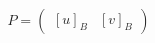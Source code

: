 \documentclass[preview]{standalone}
\begin{document}
\begin{align*}
P = \begin{pmatrix} [u]_B & [v]_B \end{pmatrix}
\end{align*}
\end{document}
